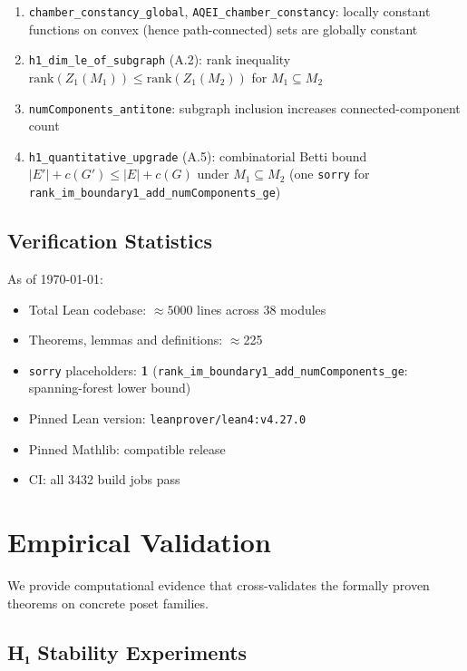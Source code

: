 \documentclass[12pt]{article}
\begin{document}
\begin{enumerate}
    \item \texttt{chamber\_constancy\_global},
          \texttt{AQEI\_chamber\_constancy}: locally constant functions on
          convex (hence path-connected) sets are globally constant
    \item \texttt{h1\_dim\_le\_of\_subgraph} (A.2): rank inequality
          $\mathrm{rank}(Z_1(M_1))\le\mathrm{rank}(Z_1(M_2))$ for
          $M_1\subseteq M_2$
    \item \texttt{numComponents\_antitone}: subgraph inclusion increases
          connected-component count
    \item \texttt{h1\_quantitative\_upgrade} (A.5): combinatorial Betti
          bound $|E'|+c(G')\le|E|+c(G)$ under $M_1\subseteq M_2$
          (one \texttt{sorry} for \texttt{rank\_im\_boundary1\_add\_numComponents\_ge})
\end{enumerate}

\subsection{Verification Statistics}

As of \today:

\begin{itemize}
    \item Total Lean codebase: $\approx 5000$ lines across 38 modules
    \item Theorems, lemmas and definitions: $\approx$225
    \item \texttt{sorry} placeholders: \textbf{1} (\texttt{rank\_im\_boundary1\_add\_numComponents\_ge}: spanning-forest lower bound)
    \item Pinned Lean version: \texttt{leanprover/lean4:v4.27.0}
    \item Pinned Mathlib: compatible release
    \item CI: all 3432 build jobs pass
\end{itemize}

\section{Empirical Validation}

We provide computational evidence that cross-validates the formally proven theorems on concrete poset families.

\subsection{H₁ Stability Experiments}
\end{document}
